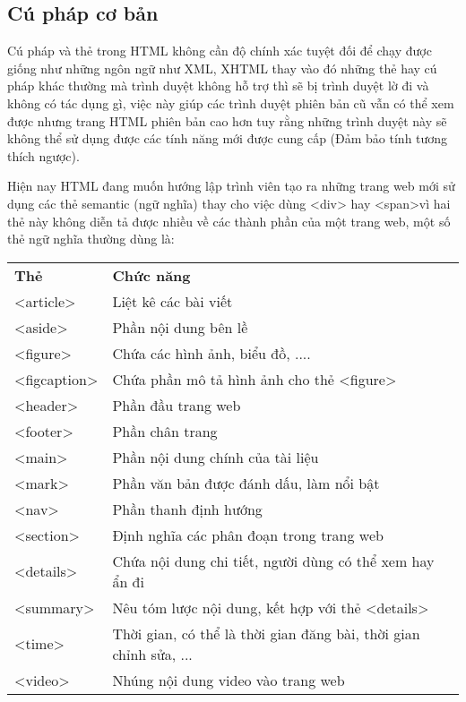 \subsection{Cú pháp cơ bản}
Cú pháp và thẻ trong HTML không cần độ chính xác tuyệt đối để chạy được
giống như những ngôn ngữ như XML, XHTML thay vào đó những thẻ hay cú pháp khác thường mà trình duyệt không hỗ trợ thì sẽ bị trình duyệt lờ đi và không có tác dụng gì, việc này giúp các trình duyệt phiên bản cũ vẫn có thể xem được nhưng trang HTML phiên bản cao hơn tuy rằng những trình duyệt này sẽ không thể sử dụng được các tính năng mới được cung cấp (Đảm bảo tính tương thích ngược).\par
Hiện nay HTML đang muốn hướng lập trình viên tạo ra những trang web mới sử dụng các thẻ semantic (ngữ nghĩa) thay cho việc dùng <div> hay <span>vì hai thẻ này không diễn tả được nhiều về các thành phần của một trang web, một số thẻ ngữ nghĩa thường dùng là:
\begin{center}
	\begin{tabular}{|l|l|}
		\cline{1-2}
		\textbf{Thẻ} & \textbf{Chức năng}                                                \\ \cline{1-2}
		<article>    & Liệt kê các bài viết                                              \\ \cline{1-2}
		<aside>      & Phần nội dung bên lề                                              \\ \cline{1-2}
		<figure>     & Chứa các hình ảnh, biểu đồ, ....                                  \\ \cline{1-2}
		<figcaption> & Chứa phần mô tả hình ảnh cho thẻ <figure>                         \\ \cline{1-2}
		<header>     & Phần đầu trang web                                                \\ \cline{1-2}
		<footer>     & Phần chân trang                                                   \\ \cline{1-2}
		<main>       & Phần nội dung chính của tài liệu                                  \\ \cline{1-2}
		<mark>       & Phần văn bản được đánh dấu, làm nổi bật                           \\ \cline{1-2}
		<nav>        & Phần thanh định hướng                                             \\ \cline{1-2}
		<section>    & Định nghĩa các phân đoạn trong trang web                          \\ \cline{1-2}
		<details>    & Chứa nội dung chi tiết, người dùng có thể xem hay ẩn đi           \\ \cline{1-2}
		<summary>    & Nêu tóm lược nội dung, kết hợp với thẻ <details>                  \\ \cline{1-2}
		<time>       & Thời gian, có thể là thời gian đăng bài, thời gian chỉnh sửa, ... \\ \cline{1-2}
		<video>      & Nhúng nội dung video vào trang web                                \\ \cline{1-2}
	\end{tabular}
\end{center}

